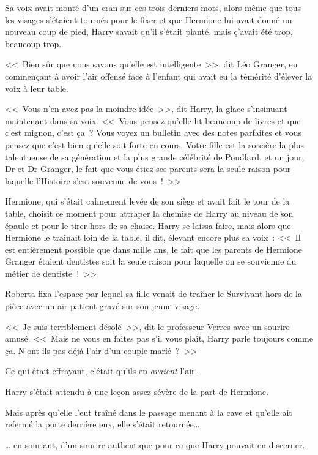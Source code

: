 Sa voix avait monté d'un cran sur ces trois derniers mots, alors même que tous les visages s'étaient tournés pour le fixer et que Hermione lui avait donné un nouveau coup de pied, Harry savait qu'il s'était planté, mais ç'avait été trop, beaucoup trop.

<<~Bien sûr que nous savons qu'elle est intelligente~>>, dit Léo Granger, en commençant à avoir l'air offensé face à l'enfant qui avait eu la témérité d'élever la voix à leur table.

<<~Vous n'en avez pas la moindre idée~>>, dit Harry, la glace s'insinuant maintenant dans sa voix. <<~Vous pensez qu'elle lit beaucoup de livres et que c'est mignon, c'est ça~? Vous voyez un bulletin avec des notes parfaites et vous pensez que c'est bien qu'elle soit forte en cours. Votre fille est la sorcière la plus talentueuse de sa génération et la plus grande célébrité de Poudlard, et un jour, Dr et Dr Granger, le fait que vous étiez ses parents sera la seule raison pour laquelle l'Histoire s'est souvenue de vous~!~>>

Hermione, qui s'était calmement levée de son siège et avait fait le tour de la table, choisit ce moment pour attraper la chemise de Harry au niveau de son épaule et pour le tirer hors de sa chaise. Harry se laissa faire, mais alors que Hermione le traînait loin de la table, il dit, élevant encore plus sa voix~: <<~Il est entièrement possible que dans mille ans, le fait que les parents de Hermione Granger étaient dentistes soit la seule raison pour laquelle on se souvienne du métier de dentiste~!~>>

\later

Roberta fixa l'espace par lequel sa fille venait de traîner le Survivant hors de la pièce avec un air patient gravé sur son jeune visage.

<<~Je suis terriblement désolé~>>, dit le professeur Verres avec un sourire amusé. <<~Mais ne vous en faites pas s'il vous plaît, Harry parle toujours comme ça. N'ont-ils pas déjà l'air d'un couple marié~?~>>

Ce qui était effrayant, c'était qu'ils en \emph{avaient} l'air.

\later

Harry s'était attendu à une leçon assez sévère de la part de Hermione.

Mais après qu'elle l'eut traîné dans le passage menant à la cave et qu'elle ait refermé la porte derrière eux, elle s'était retournée…

… en souriant, d'un sourire authentique pour ce que Harry pouvait en discerner.

